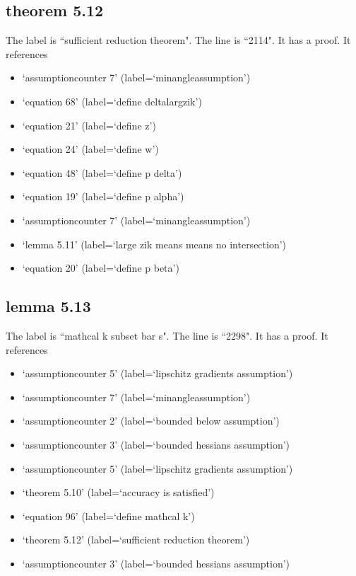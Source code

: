 \documentclass{article}
\begin{document}
\subsection{theorem 5.12}
The label is ``sufficient reduction theorem".
The line is ``2114".
It has a proof.
It references \begin{itemize}
\item `assumptioncounter 7' (label=`minangleassumption')
\item `equation 68' (label=`define deltalargzik')
\item `equation 21' (label=`define z')
\item `equation 24' (label=`define w')
\item `equation 48' (label=`define p delta')
\item `equation 19' (label=`define p alpha')
\item `assumptioncounter 7' (label=`minangleassumption')
\item `lemma 5.11' (label=`large zik means means no intersection')
\item `equation 20' (label=`define p beta')
\end{itemize}
\subsection{lemma 5.13}
The label is ``mathcal k subset bar s".
The line is ``2298".
It has a proof.
It references \begin{itemize}
\item `assumptioncounter 5' (label=`lipschitz gradients assumption')
\item `assumptioncounter 7' (label=`minangleassumption')
\item `assumptioncounter 2' (label=`bounded below assumption')
\item `assumptioncounter 3' (label=`bounded hessians assumption')
\item `assumptioncounter 5' (label=`lipschitz gradients assumption')
\item `theorem 5.10' (label=`accuracy is satisfied')
\item `equation 96' (label=`define mathcal k')
\item `theorem 5.12' (label=`sufficient reduction theorem')
\item `assumptioncounter 3' (label=`bounded hessians assumption')
\end{itemize}
\end{document}
